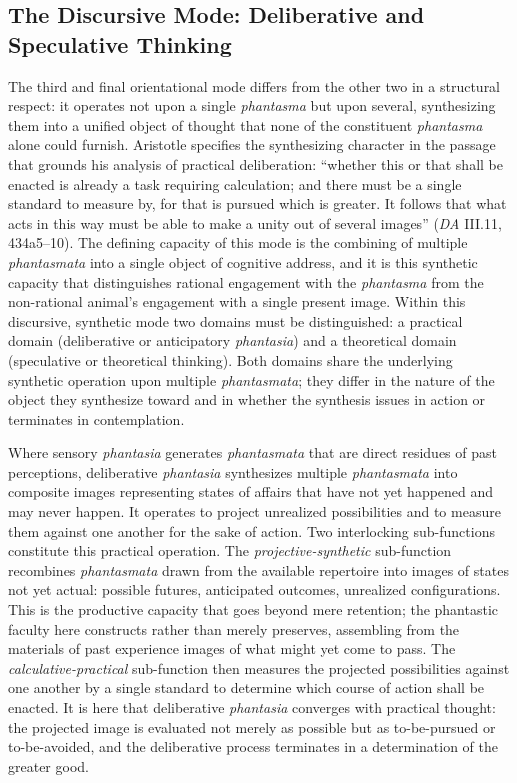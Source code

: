 \documentclass{article}
\begin{document}
\subsection{The Discursive Mode: Deliberative and Speculative Thinking}

The third and final orientational mode differs from the other two in a structural respect: it operates not upon a single \textit{phantasma} but upon several, synthesizing them into a unified object of thought that none of the constituent \textit{phantasma} alone could furnish. Aristotle specifies the synthesizing character in the passage that grounds his analysis of practical deliberation: ``whether this or that shall be enacted is already a task requiring calculation; and there must be a single standard to measure by, for that is pursued which is greater. It follows that what acts in this way must be able to make a unity out of several images'' (\textit{DA} III.11, 434a5--10). The defining capacity of this mode is the combining of multiple \textit{phantasmata} into a single object of cognitive address, and it is this synthetic capacity that distinguishes rational engagement with the \textit{phantasma} from the non-rational animal's engagement with a single present image. Within this discursive, synthetic mode two domains must be distinguished: a practical domain (deliberative or anticipatory \textit{phantasia}) and a theoretical domain (speculative or theoretical thinking). Both domains share the underlying synthetic operation upon multiple \textit{phantasmata}; they differ in the nature of the object they synthesize toward and in whether the synthesis issues in action or terminates in contemplation. 

Where sensory \textit{phantasia} generates \textit{phantasmata} that are direct residues of past perceptions, deliberative \textit{phantasia} synthesizes multiple \textit{phantasmata} into composite images representing states of affairs that have not yet happened and may never happen. It operates to project unrealized possibilities and to measure them against one another for the sake of action. Two interlocking sub-functions constitute this practical operation. The \textit{projective-synthetic} sub-function recombines \textit{phantasmata} drawn from the available repertoire into images of states not yet actual: possible futures, anticipated outcomes, unrealized configurations. This is the productive capacity that goes beyond mere retention; the phantastic faculty here constructs rather than merely preserves, assembling from the materials of past experience images of what might yet come to pass. The \textit{calculative-practical} sub-function then measures the projected possibilities against one another by a single standard to determine which course of action shall be enacted. It is here that deliberative \textit{phantasia} converges with practical thought: the projected image is evaluated not merely as possible but as to-be-pursued or to-be-avoided, and the deliberative process terminates in a determination of the greater good. 
\end{document}
